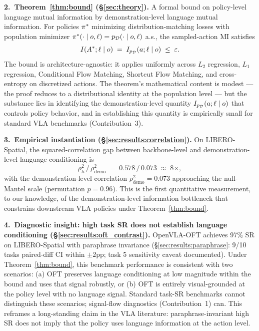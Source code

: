 \textbf{2.~Theorem~\ref{thm:bound} (\S\ref{sec:theory}).} A formal bound on policy-level
language mutual information by demonstration-level language mutual information. For
policies $\pi^{*}$ minimizing distribution-matching losses with population minimizer
$\pi^{*}(\cdot \mid o, \ell) = p_{\mathcal{D}}(\cdot \mid o, \ell)$ a.s., the sampled-action MI
satisfies
\begin{equation}
I(A^{*}; \ell \mid o) \;=\; I_{p_{\mathcal{D}}}(a; \ell \mid o) \;\le\; \varepsilon.
\label{eq:thm_bound_intro}
\end{equation}
The bound is architecture-agnostic: it applies uniformly across $L_2$ regression, $L_1$
regression, Conditional Flow Matching, Shortcut Flow Matching, and cross-entropy on
discretized actions. The theorem's mathematical content is modest --- the proof reduces to
a distributional identity at the population level --- but the substance lies in identifying
the demonstration-level quantity $I_{p_{\mathcal{D}}}(a; \ell \mid o)$ that controls policy behavior,
and in establishing this quantity is empirically small for standard VLA benchmarks
(Contribution~3).

\textbf{3.~Empirical instantiation (\S\ref{sec:results:correlation}).} On LIBERO-Spatial,
the squared-correlation gap between backbone-level and demonstration-level language
conditioning is
\begin{equation}
\rho_h^2 \,/\, \rho_{\text{demo}}^2 \;=\; 0.578 \,/\, 0.073 \;\approx\; 8\times,
\label{eq:gap_intro}
\end{equation}
with the demonstration-level correlation $\rho_{\text{demo}}^2 = 0.073$ approaching the
null-Mantel scale (permutation $p = 0.96$). This is the first quantitative measurement, to
our knowledge, of the demonstration-level information bottleneck that constrains downstream
VLA policies under Theorem~\ref{thm:bound}.

\textbf{4.~Diagnostic insight: high task SR does not establish language conditioning
(\S\ref{sec:results:oft_contrast}).} OpenVLA-OFT achieves 97\% SR on LIBERO-Spatial with
paraphrase invariance (\S\ref{sec:results:paraphrase}: 9/10 tasks paired-diff CI within
$\pm$2pp; task 5 sensitivity caveat documented). Under Theorem~\ref{thm:bound}, this
benchmark performance is consistent with two scenarios: (a) OFT preserves language
conditioning at low magnitude within the bound and uses that signal robustly, or (b) OFT
is entirely visual-grounded at the policy level with no language signal. Standard task-SR
benchmarks cannot distinguish these scenarios; signal-flow diagnostics (Contribution~1)
can. This reframes a long-standing claim in the VLA literature: paraphrase-invariant high
SR does not imply that the policy uses language information at the action level.

